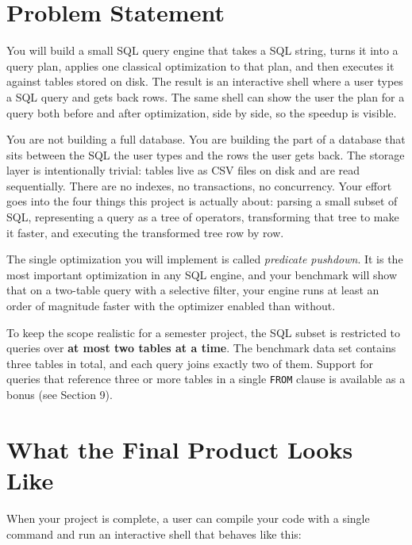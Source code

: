 \documentclass[11pt,a4paper]{article}
\begin{document}

\section{Problem Statement}

You will build a small SQL query engine that takes a SQL string, turns it into a query plan, applies one classical optimization to that plan, and then executes it against tables stored on disk. The result is an interactive shell where a user types a SQL query and gets back rows. The same shell can show the user the plan for a query both before and after optimization, side by side, so the speedup is visible.

You are not building a full database. You are building the part of a database that sits between the SQL the user types and the rows the user gets back. The storage layer is intentionally trivial: tables live as CSV files on disk and are read sequentially. There are no indexes, no transactions, no concurrency. Your effort goes into the four things this project is actually about: parsing a small subset of SQL, representing a query as a tree of operators, transforming that tree to make it faster, and executing the transformed tree row by row.

The single optimization you will implement is called \textit{predicate pushdown}. It is the most important optimization in any SQL engine, and your benchmark will show that on a two-table query with a selective filter, your engine runs at least an order of magnitude faster with the optimizer enabled than without.

To keep the scope realistic for a semester project, the SQL subset is restricted to queries over \textbf{at most two tables at a time}. The benchmark data set contains three tables in total, and each query joins exactly two of them. Support for queries that reference three or more tables in a single \texttt{FROM} clause is available as a bonus (see Section 9).

\section{What the Final Product Looks Like}

When your project is complete, a user can compile your code with a single command and run an interactive shell that behaves like this:
\end{document}
